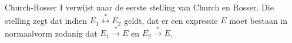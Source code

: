   Church-Rosser I verwijst naar de eerste stelling van Church en Rosser. Die stelling zegt dat indien $E_1 \stackrel{*}{\longleftrightarrow} E_2$ geldt, dat er een expressie $E$ moet bestaan in normaalvorm zodanig dat $E_1 \stackrel{*}{\longrightarrow} E$ en $E_2 \stackrel{*}{\longrightarrow} E$.